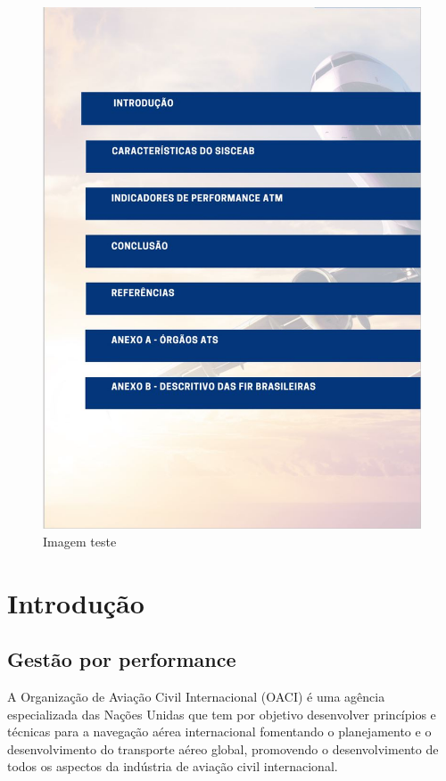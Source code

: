 \documentclass[
]{book}
\theoremstyle{definition}
\theoremstyle{definition}
\theoremstyle{definition}
\theoremstyle{definition}
\theoremstyle{remark}
\begin{document}
\begin{figure}
\centering
\includegraphics{imagens/fig7.jpg}
\caption{Imagem teste}
\end{figure}

\hypertarget{introduuxe7uxe3o}{%
\chapter{Introdução}\label{introduuxe7uxe3o}}

\hypertarget{gestuxe3o-por-performance}{%
\section{Gestão por performance}\label{gestuxe3o-por-performance}}

A Organização de Aviação Civil Internacional (OACI) é uma agência especializada das Nações Unidas que tem por objetivo desenvolver princípios e técnicas para a navegação aérea internacional fomentando o planejamento e o desenvolvimento do transporte aéreo global, promovendo o desenvolvimento de todos os aspectos da indústria de aviação civil internacional.
\end{document}
